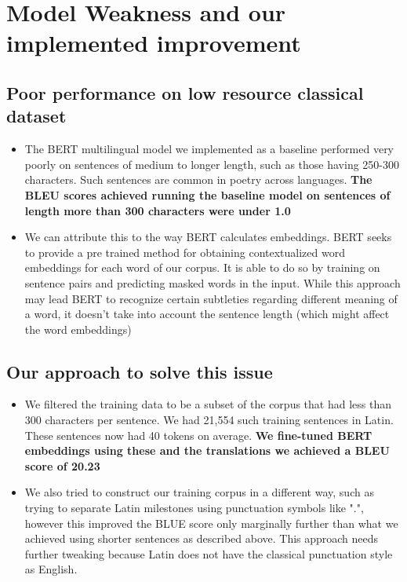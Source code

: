 \documentclass[11pt,a4paper]{article}
\begin{document}
\section{Model Weakness and our implemented improvement}
\subsection{Poor performance on low resource classical dataset}
\begin{itemize}
    \item The BERT multilingual model we implemented as a baseline performed very poorly on sentences of medium to longer length, such as those having 250-300 characters. Such sentences are common in poetry across languages. \textbf{The BLEU scores achieved running the baseline model on sentences of length more than 300 characters were under 1.0}
    \item We can attribute this to the way BERT calculates embeddings. BERT seeks to provide a pre trained method for obtaining contextualized word embeddings for each word of our corpus. It is able to do so by training on sentence pairs and predicting masked words in the input. While this approach may lead BERT to recognize certain subtleties regarding different meaning of a word, it doesn't take into account the sentence length (which might affect the word embeddings)
\end{itemize}

\subsection{Our approach to solve this issue}
\begin{itemize}
    \item We filtered the training data to be a subset of the corpus that had less than 300 characters per sentence. We had 21,554 such training sentences in Latin. These sentences now had 40 tokens on average. \textbf{We fine-tuned BERT embeddings using these and the translations we achieved a BLEU score of 20.23}
    \item We also tried to construct our training corpus in a different way, such as trying to separate Latin milestones using punctuation symbols like ".", however this improved the BLUE score only marginally further than what we achieved using shorter sentences as described above. This approach needs further tweaking because Latin does not have the classical punctuation style as English.
\end{itemize}
\end{document}
